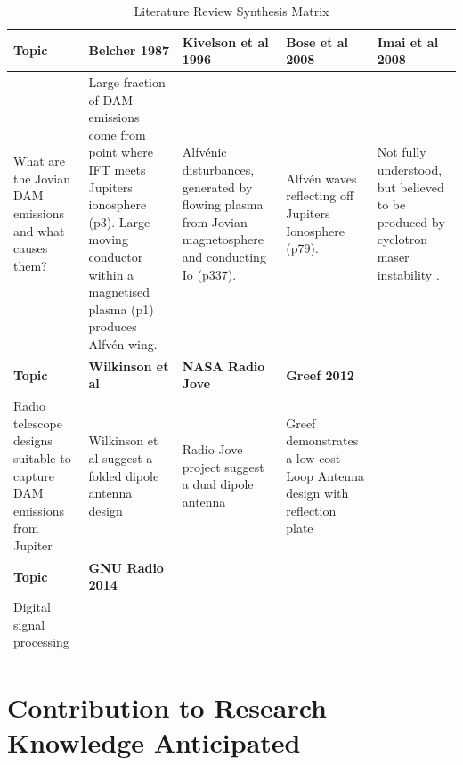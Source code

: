 \documentclass[runningheads,a4paper]{llncs}
\begin{document}
%
\begin{table}
  \centering
  \begin{tabular}{ | p{2.5cm} || p{2.5cm} | p{2.5cm} | p{2.5cm} | p{2.5cm} |}
    \hline
    \textbf{Topic} & \textbf{Belcher 1987} & \textbf{Kivelson et al 1996} & \textbf{Bose et al 2008} & \textbf{Imai et al 2008} \\ \hline \hline
    What are the Jovian DAM emissions and what causes them? & Large fraction of DAM emissions come from point where IFT meets Jupiters ionosphere (p3). Large moving conductor within a magnetised plasma (p1) produces Alfv\'en wing. & Alfv\'enic disturbances, generated by flowing plasma from Jovian magnetosphere and conducting Io (p337). & Alfv\'en waves reflecting off Jupiters Ionosphere (p79). & Not fully understood, but believed to be produced by cyclotron maser instability \citep{imai-08}. \\ \hline \hline

    \textbf{Topic} & \textbf{Wilkinson et al} & \textbf{NASA Radio Jove} & \textbf{Greef 2012} &  \\ \hline \hline

    Radio telescope designs suitable to capture DAM emissions from Jupiter & Wilkinson et al suggest a folded dipole antenna design & Radio Jove project suggest a dual dipole antenna & Greef demonstrates a low cost Loop Antenna design with reflection plate & \\ \hline \hline
    
    \textbf{Topic} & \textbf{GNU Radio 2014} &  & & \\ \hline \hline    
    
    Digital signal processing & & & &  \\ 
    

    
    \hline
  \end{tabular}
  \caption{Literature Review Synthesis Matrix}
  \label{tab:literature_review_synthesis_matrix}
\end{table}
%

%
%
\newpage
\section*{Contribution to Research Knowledge Anticipated}
\end{document}

